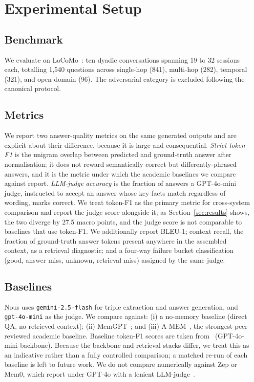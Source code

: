 \documentclass[11pt,a4paper,twocolumn]{article}
\begin{document}
\section{Experimental Setup}

\subsection{Benchmark}
We evaluate on LoCoMo~\citep{maharana2024locomo}: ten dyadic conversations
spanning 19 to 32 sessions each, totalling 1,540 questions across single-hop
(841), multi-hop (282), temporal (321), and open-domain (96). The adversarial
category is excluded following the canonical protocol.

\subsection{Metrics}
We report two answer-quality metrics on the same generated outputs and are
explicit about their difference, because it is large and consequential.
\emph{Strict token-F1} is the unigram overlap between predicted and
ground-truth answer after normalisation; it does not reward semantically
correct but differently-phrased answers, and it is the metric under which the
academic baselines we compare against report. \emph{LLM-judge accuracy} is the
fraction of answers a GPT-4o-mini judge, instructed to accept an answer whose
key facts match regardless of wording, marks correct. We treat token-F1 as the
primary metric for cross-system comparison and report the judge score
alongside it; as Section~\ref{sec:results} shows, the two diverge by 27.5 macro
points, and the judge score is not comparable to baselines that use token-F1.
We additionally report BLEU-1; context recall, the fraction of ground-truth
answer tokens present anywhere in the assembled context, as a retrieval
diagnostic; and a four-way failure bucket classification (good, answer miss,
unknown, retrieval miss) assigned by the same judge.

\subsection{Baselines}
Nous uses \texttt{gemini-2.5-flash} for triple extraction and answer
generation, and \texttt{gpt-4o-mini} as the judge. We compare against: (i) a
no-memory baseline (direct QA, no retrieved context); (ii)
MemGPT~\citep{packer2023memgpt}; and (iii) A-MEM~\citep{xu2025amem}, the
strongest peer-reviewed academic baseline. Baseline token-F1 scores are taken
from~\citet{xu2025amem} (GPT-4o-mini backbone). Because the backbone and
retrieval stacks differ, we treat this as an indicative rather than a fully
controlled comparison; a matched re-run of each baseline is left to future
work. We do not compare numerically against Zep or Mem0, which report under
GPT-4o with a lenient LLM-judge~\citep{locomo2025audit}.
\end{document}
